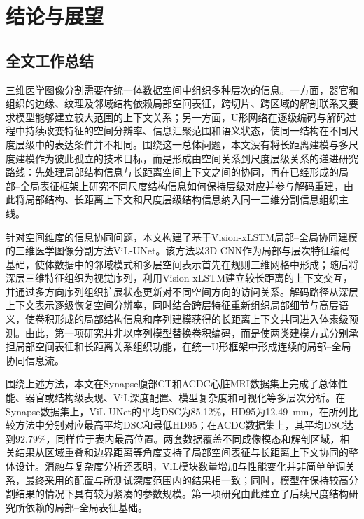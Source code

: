 \chapter{结论与展望}


\section{全文工作总结}

三维医学图像分割需要在统一体数据空间中组织多种层次的信息。一方面，器官和组织的边缘、纹理及邻域结构依赖局部空间表征，跨切片、跨区域的解剖联系又要求模型能够建立较大范围的上下文关系；另一方面，U形网络在逐级编码与解码过程中持续改变特征的空间分辨率、信息汇聚范围和语义状态，使同一结构在不同尺度层级中的表达条件并不相同。围绕这一总体问题，本文没有将长距离建模与多尺度建模作为彼此孤立的技术目标，而是形成由空间关系到尺度层级关系的递进研究路线：先处理局部结构信息与长距离空间上下文之间的协同，再在已经形成的局部--全局表征框架上研究不同尺度结构信息如何保持层级对应并参与解码重建，由此将局部结构、长距离上下文和尺度层级结构信息纳入同一三维分割信息组织主线。

针对空间维度的信息协同问题，本文构建了基于Vision-xLSTM局部--全局协同建模的三维医学图像分割方法ViL-UNet。该方法以3D CNN作为局部与层次特征编码基础，使体数据中的邻域模式和多层空间表示首先在规则三维网格中形成；随后将深层三维特征组织为视觉序列，利用Vision-xLSTM建立较长距离的上下文交互，并通过多方向序列组织扩展状态更新对不同空间方向的访问关系。解码路径从深层上下文表示逐级恢复空间分辨率，同时结合跨层特征重新组织局部细节与高层语义，使卷积形成的局部结构信息和序列建模获得的长距离上下文共同进入体素级预测。由此，第一项研究并非以序列模型替换卷积编码，而是使两类建模方式分别承担局部空间表征和长距离关系组织功能，在统一U形框架中形成连续的局部--全局协同信息流。

围绕上述方法，本文在Synapse腹部CT和ACDC心脏MRI数据集上完成了总体性能、器官或结构级表现、ViL深度配置、模型复杂度和可视化等多层次分析。在Synapse数据集上，ViL-UNet的平均DSC为85.12\%，HD95为12.49~mm，在所列比较方法中分别对应最高平均DSC和最低HD95；在ACDC数据集上，其平均DSC达到92.79\%，同样位于表内最高位置。两套数据覆盖不同成像模态和解剖区域，相关结果从区域重叠和边界距离等角度支持了局部空间表征与长距离上下文协同的整体设计。消融与复杂度分析还表明，ViL模块数量增加与性能变化并非简单单调关系，最终采用的配置与所测试深度范围内的结果相一致；同时，模型在保持较高分割结果的情况下具有较为紧凑的参数规模。第一项研究由此建立了后续尺度结构研究所依赖的局部--全局表征基础。

